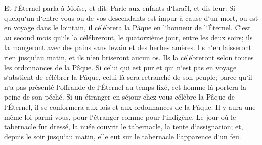 \verse Et l`Éternel parla à Moïse, et dit: 
\verse Parle aux enfants d`Israël, et dis-leur: Si quelqu`un d`entre vous ou de vos descendants est impur à cause d`un mort, ou est en voyage dans le lointain, il célébrera la Pâque en l`honneur de l`Éternel. 
\verse C`est au second mois qu`ils la célébreront, le quatorzième jour, entre les deux soirs; ils la mangeront avec des pains sans levain et des herbes amères. 
\verse Ils n`en laisseront rien jusqu`au matin, et ils n`en briseront aucun os. Ils la célébreront selon toutes les ordonnances de la Pâque. 
\verse Si celui qui est pur et qui n`est pas en voyage s`abstient de célébrer la Pâque, celui-là sera retranché de son peuple; parce qu`il n`a pas présenté l`offrande de l`Éternel au temps fixé, cet homme-là portera la peine de son péché. 
\verse Si un étranger en séjour chez vous célèbre la Pâque de l`Éternel, il se conformera aux lois et aux ordonnances de la Pâque. Il y aura une même loi parmi vous, pour l`étranger comme pour l`indigène. 
\verse Le jour où le tabernacle fut dressé, la nuée couvrit le tabernacle, la tente d`assignation; et, depuis le soir jusqu`au matin, elle eut sur le tabernacle l`apparence d`un feu. 
